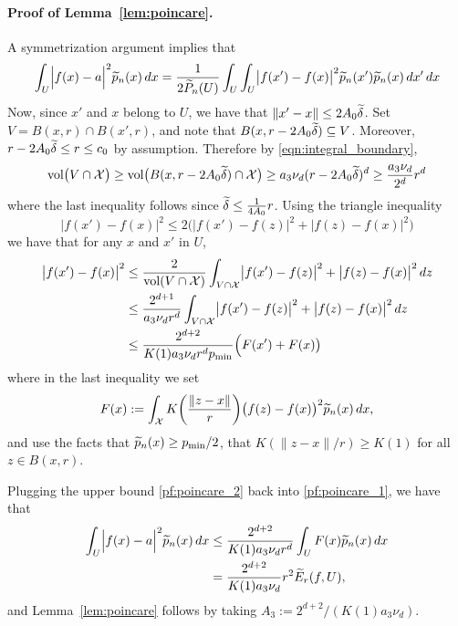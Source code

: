 \paragraph{Proof of Lemma~\ref{lem:poincare}.}
A symmetrization argument implies that
\begin{equation}
\label{pf:poincare_1}
\int_{U} \Bigl|f(x)-a\Bigr|^2 \widetilde{p}_n(x)\,dx = \frac{1}{2\widetilde{P}_n(U)} \int_{U} \int_{U} \bigl|f(x') - f(x)\bigr|^2 \widetilde{p}_n(x') \widetilde{p}_n(x) \,dx' \,dx
\end{equation}
Now, since $x'$ and $x$ belong to $U$, we have that $\|x' - x\| \leq 2A_0\widetilde{\delta}$. Set $V = B(x,r) \cap B(x',r)$, and note that $B(x,r - 2A_0\widetilde{\delta}) \subseteq V$. Moreover, $r - 2A_0\widetilde{\delta} \leq r \leq c_0$ by assumption. Therefore by \eqref{eqn:integral_boundary},
\begin{equation*}
\text{vol}\bigl(V \cap \mathcal{X}\bigr) \geq \text{vol}\bigl(B(x,r - 2A_0\widetilde{\delta}) \cap \mathcal{X}\bigr) \geq a_3 \nu_d (r - 2A_0\widetilde{\delta})^d \geq \frac{a_3 \nu_d}{2^d}r^d 
\end{equation*}
where the last inequality follows since $\widetilde{\delta} \leq \frac{1}{4A_0}r$. Using the triangle inequality 
\begin{equation*}
\bigl|f(x') - f(x)\big|^2 \leq 2\bigl(\bigl|f(x') - f(z)\big|^2 + \bigl|f(z) - f(x)\big|^2\bigr)
\end{equation*}
we have that for any $x$ and $x'$ in $U$,
\begin{align}
\bigl|f(x') - f(x)\big|^2 & \leq \frac{2}{\text{vol}(V \cap \mathcal{X})} \int_{V \cap \mathcal{X}} \bigl|f(x') - f(z)\big|^2 + \bigl|f(z) - f(x)\big|^2 \,dz \nonumber \\
& \leq \frac{2^{d + 1}}{a_3 \nu_d r^d} \int_{V \cap \mathcal{X}} \bigl|f(x') - f(z)\big|^2 + \bigl|f(z) - f(x)\big|^2 \,dz \nonumber \\
& \leq \frac{2^{d + 2}}{K(1) a_3 \nu_d r^d p_{\min}} \Bigl(F(x') + F(x)\bigr) \label{pf:poincare_2}
\end{align}
where in the last inequality we set
\begin{equation*}
F(x) := \int_{\mathcal{X}} K\biggl(\frac{\|z - x\|}{r}\biggr) \bigl(f(z) - f(x)\bigr)^2 \widetilde{p}_n(x) \,dx,
\end{equation*}
and use the facts that $\widetilde{p}_n(x) \geq p_{\min}/2$, that $K(\|z  - x\|/r) \geq K(1)$ for all $z \in B(x,r)$. 

Plugging the upper bound \eqref{pf:poincare_2} back into \eqref{pf:poincare_1}, we have that
\begin{align*}
\int_{U} \Bigl|f(x)-a\Bigr|^2 \widetilde{p}_n(x)\,dx & \leq \frac{2^{d + 2}}{K(1) a_3 \nu_d r^d} \int_{U} F(x)\widetilde{p}_n(x) \,dx \\
& = \frac{2^{d + 2}}{K(1) a_3 \nu_d}r^2 \widetilde{E}_r(f,U),
\end{align*}
and Lemma~\ref{lem:poincare} follows by taking $A_3 := 2^{d + 2}/(K(1) a_3 \nu_d)$.


